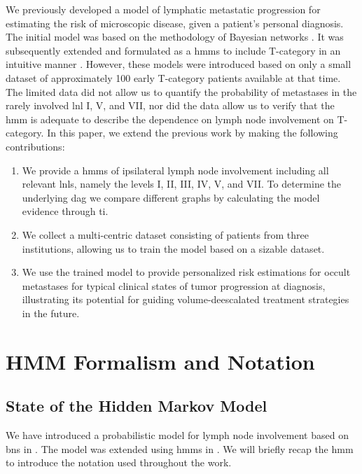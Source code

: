 \documentclass[twocolumn]{aastex631}
\begin{document}
We previously developed a model of lymphatic metastatic progression for estimating the risk of microscopic disease, given a patient's personal diagnosis. The initial model was based on the methodology of Bayesian networks \cite{pouymayou_bayesian_2019}. It was subsequently extended and formulated as a \glspl{hmm} to include T-category in an intuitive manner \cite{ludwig_hidden_2021}. However, these models were introduced based on only a small dataset of approximately 100 early T-category patients \cite{sanguineti_defining_2009} available at that time. The limited data did not allow us to quantify the probability of metastases in the rarely involved \gls{lnl} I, V, and VII, nor did the data allow us to verify that the \gls{hmm} is adequate to describe the dependence on lymph node involvement on T-category. In this paper, we extend the previous work \cite{ludwig_hidden_2021} by making the following contributions:
\begin{enumerate}
    \item We provide a \glspl{hmm} of ipsilateral lymph node involvement including all relevant \glspl{lnl}, namely the levels I, II, III, IV, V, and VII. To determine the underlying \gls{dag} we compare different graphs by calculating the model evidence through \gls{ti}.
    \item We collect a multi-centric dataset consisting of  patients from three institutions, allowing us to train the model based on a sizable dataset.
    \item We use the trained model to provide personalized risk estimations for occult metastases for typical clinical states of tumor progression at diagnosis, illustrating its potential for guiding volume-deescalated treatment strategies in the future. 
\end{enumerate}



\section{HMM Formalism and Notation}
\label{sec:formalism}



\subsection{State of the Hidden Markov Model}
\label{subsec:formalism:state}

We have introduced a probabilistic model for lymph node involvement based on \glspl{bn} in \cite{pouymayou_bayesian_2019}. The model was extended using \glspl{hmm} in \cite{ludwig_hidden_2021}. We will briefly recap the \acrlong{hmm} to introduce the notation used throughout the work.
\end{document}

